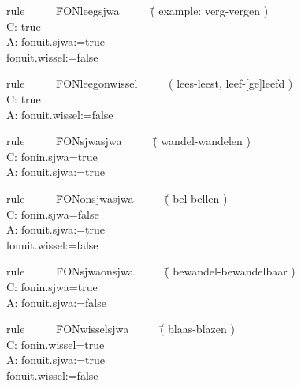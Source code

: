 \begin{tabbing}
rule   \ \ \ \ \  \= FONleegsjwa   \ \ \ \ \  \= ( example: verg-vergen ) \\
C:   \> true                  \>                          \\
A:   \> fonuit.sjwa:=true     \>                          \\
     \> fonuit.wissel:=false  \>                          \\
\end{tabbing}

\begin{tabbing}
rule \ \ \ \ \  \= FONleegonwissel \ \ \ \ \  \= ( lees-leest, 
leef-[ge]leefd ) \\
C:   \> true                  \>                                \\
A:   \> fonuit.wissel:=false  \>                                \\
\end{tabbing}

\begin{tabbing}
rule \ \ \ \ \   \= FONsjwasjwa           \ \ \ \ \   \= ( wandel-wandelen ) \\
C:   \> fonin.sjwa=true       \>                     \\
A:   \> fonuit.sjwa:=true     \>                     \\
\end{tabbing}

\begin{tabbing}
rule \ \ \ \ \   \= FONonsjwasjwa \ \ \ \ \   \= ( bel-bellen )   \\
C:   \> fonin.sjwa=false      \>                          \\
A:   \> fonuit.sjwa:=true     \>                          \\
     \> fonuit.wissel:=false  \>                          \\
\end{tabbing}

\begin{tabbing}
rule \ \ \ \ \   \= FONsjwaonsjwa \ \ \ \ \   \= ( bewandel-bewandelbaar )    \\
C:   \> fonin.sjwa=true       \>                          \\
A:   \> fonuit.sjwa:=false    \>                          \\
\end{tabbing}

\begin{tabbing}
rule \ \ \ \ \   \= FONwisselsjwa \ \ \ \ \   \= ( blaas-blazen )         \\
C:   \> fonin.wissel=true     \>                          \\
A:   \> fonuit.sjwa:=true     \>                          \\
     \> fonuit.wissel:=false  \>                          \\
\end{tabbing}

